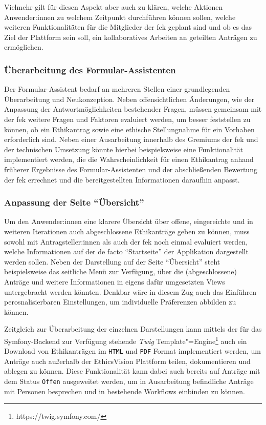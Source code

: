 \documentclass[a4paper,12pt,twoside]{scrreprt}
\begin{document}
Vielmehr gilt für diesen Aspekt aber auch zu klären, welche Aktionen Anwender:innen zu welchem Zeitpunkt durchführen können sollen, welche weiteren Funktionalitäten für die Mitglieder der \acl{fek} geplant sind und ob es das Ziel der Plattform sein soll, ein kollaboratives Arbeiten an geteilten Anträgen zu ermöglichen.

\subsubsection*{Überarbeitung des Formular-Assistenten}
\label{sub-sub-sec:überarbeitung-formular-assistent}

Der Formular-Assistent bedarf an mehreren Stellen einer grundlegenden Überarbeitung und Neukonzeption. Neben offensichtlichen Änderungen, wie der Anpassung der Antwortmöglichkeiten bestehender Fragen, müssen gemeinsam mit der \ac{fek} weitere Fragen und Faktoren evaluiert werden, um besser feststellen zu können, ob ein Ethikantrag sowie eine ethische Stellungnahme für ein Vorhaben erforderlich sind. Neben einer Ausarbeitung innerhalb des Gremiums der \ac{fek} und der technischen Umsetzung könnte hierbei beispielsweise eine Funktionalität implementiert werden, die die Wahrscheinlichkeit für einen Ethikantrag anhand früherer Ergebnisse des Formular-Assistenten und der abschließenden Bewertung der \ac{fek} errechnet und die bereitgestellten Informationen daraufhin anpasst.

\subsubsection*{Anpassung der Seite \enquote{Übersicht}}
\label{sub-sub-sec:anpassung-seite-übersicht}

Um den Anwender:innen eine klarere Übersicht über offene, eingereichte und in weiteren Iterationen auch abgeschlossene Ethikanträge geben zu können, muss sowohl mit Antragsteller:innen als auch der \ac{fek} noch einmal evaluiert werden, welche Informationen auf der de facto \enquote{Startseite} der Applikation dargestellt werden sollen. Neben der Darstellung auf der Seite \enquote{Übersicht} steht beispielsweise das seitliche Menü zur Verfügung, über die (abgeschlossene) Anträge und weitere Informationen in eigens dafür umgesetzten Views untergebracht werden könnten. Denkbar wäre in diesem Zug auch das Einführen perosnalisierbaren Einstellungen, um individuelle Präferenzen abbilden zu können.

\medskip

Zeitgleich zur Überarbeitung der einzelnen Darstellungen kann mittels der für das Symfony-Backend zur Verfügung stehende \textit{Twig} Template"=Engine\footnote{https://twig.symfony.com/} auch ein Download von Ethikanträgen im \texttt{HTML} und \texttt{PDF} Format implementiert werden, um Anträge auch außerhalb der EthicsVision Plattform teilen, dokumentieren und ablegen zu können. Diese Funktionalität kann dabei auch bereits auf Anträge mit dem Status \texttt{Offen} ausgeweitet werden, um in Ausarbeitung befindliche Anträge mit Personen besprechen und in bestehende Workflows einbinden zu können.
\end{document}
